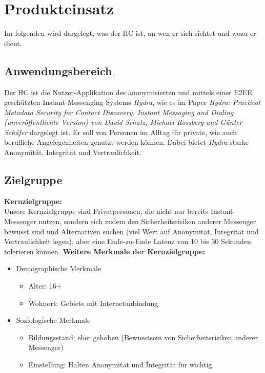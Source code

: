 \section{Produkteinsatz}
\textnormal{Im folgenden wird dargelegt, was der \ac{HC} ist, an wen er sich richtet und wozu er dient.}

\subsection{Anwendungsbereich}

\textnormal{Der \ac{HC} ist die Nutzer-Applikation des anonymisierten und mittels einer \ac{E2EE} geschützten Instant-Messenging Systems \textit{Hydra}, wie es im Paper \textit{Hydra: Practical Metadata Security for Contact Discovery, Instant Messaging and Dialing  (unveröffentlichte Version) von David Schatz, Michael Rossberg und Günter Schäfer } dargelegt ist. 
Er soll von Personen im Alltag für private, wie auch berufliche Angelegenheiten genutzt werden können. 
Dabei bietet \textit{Hydra} starke Anonymität, Integrität und Vertraulichkeit.
}


\subsection{Zielgruppe} 


\textbf{Kernzielgruppe:} \\
 
Unsere Kernzielgruppe sind Privatpersonen, die nicht nur bereits Instant-Messenger nutzen, sondern sich zudem den Sicherheitsrisiken anderer Messenger bewusst sind und Alternativen suchen (viel Wert auf Anonymität, Integrität und Vertraulichkeit legen), aber eine Ende-zu-Ende Latenz von 10 bis 30 Sekunden tolerieren können.
\newline\linebreak
\textbf{Weitere Merkmale der Kernzielgruppe:}
\begin{itemize}
	\item Demographische Merkmale
	\begin{itemize}
		\item Alter: 16+
		\item Wohnort: Gebiete mit Internetanbindung
	 \end{itemize}
	 \item Soziologische Merkmale
	 \begin{itemize}
	 	\item Bildungsstand: eher gehoben (Bewusstsein von Sicherheitsrisiken anderer Messenger)
	 	\item Einstellung: Halten Anonymität und Integrität für wichtig 
	 	
	 \end{itemize}	 	
\end{itemize}



